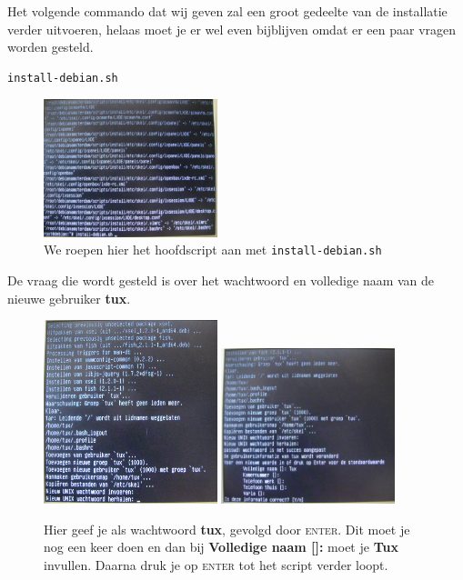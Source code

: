 \documentclass[12pt,a4paper]{article}
\begin{document}
Het volgende commando dat wij geven zal een groot gedeelte van de installatie verder uitvoeren, helaas moet je er wel even bijblijven omdat er een paar vragen worden gesteld.

\begin{lstlisting}[language=bash]
install-debian.sh
\end{lstlisting}

\begin{figure}[H]
\centering
\includegraphics[width=0.45\textwidth]{install-debian-scherm}
\caption{We roepen hier het hoofdscript aan met \texttt{install-debian.sh}}
\label{fig:install-debian}
\end{figure}

De vraag die wordt gesteld is over het wachtwoord en volledige naam van de nieuwe gebruiker \textbf{tux}.

\begin{figure}[H]
\centering
\includegraphics[width=0.45\textwidth]{tux-wachtwoord-scherm}
\includegraphics[width=0.45\textwidth]{tux-volledige-naam-scherm}
\caption{Hier geef je als wachtwoord \textbf{tux}, gevolgd door \textsc{enter}. Dit moet je nog een keer doen en dan bij \textbf{Volledige naam []:} moet je \textbf{Tux} invullen. Daarna druk je op \textsc{enter} tot het script verder loopt.}
\label{fig:tuxinfo}
\end{figure}
\end{document}
